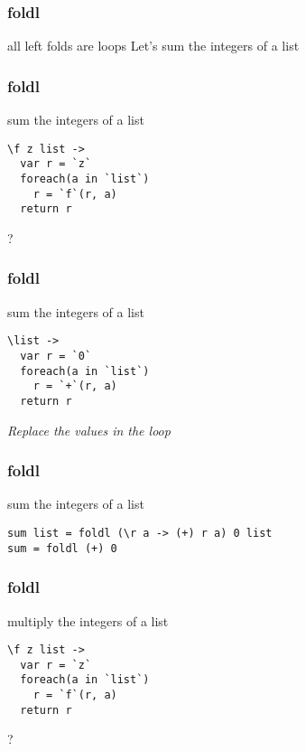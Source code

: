 \begin{frame}[fragile]
\frametitle{foldl}
\begin{block}{all left folds are loops}
Let's sum the integers of a list
\end{block}
\end{frame}

\begin{frame}[fragile]
\frametitle{foldl}
\begin{block}{sum the integers of a list}
\begin{lstlisting}[style=haskell,basicstyle=\scriptsize\ttfamily,mathescape]
\f z list ->
  var r = `z`
  foreach(a in `list`)
    r = `f`(r, a)
  return r
\end{lstlisting}
\end{block}
\begin{center}
\LARGE
?
\end{center}
\end{frame}

\begin{frame}[fragile]
\frametitle{foldl}
\begin{block}{sum the integers of a list}
\begin{lstlisting}[style=haskell,basicstyle=\scriptsize\ttfamily,mathescape]
\list ->
  var r = `0`
  foreach(a in `list`)
    r = `+`(r, a)
  return r
\end{lstlisting}
\end{block}
\begin{center}
\LARGE
\emph{Replace the values in the loop}
\end{center}
\end{frame}

\begin{frame}[fragile]
\frametitle{foldl}
\begin{block}{sum the integers of a list}
\begin{lstlisting}[style=haskell,basicstyle=\scriptsize\ttfamily,mathescape]
sum list = foldl (\r a -> (+) r a) 0 list
sum = foldl (+) 0
\end{lstlisting}
\end{block}
\end{frame}

\begin{frame}[fragile]
\frametitle{foldl}
\begin{block}{multiply the integers of a list}
\begin{lstlisting}[style=haskell,basicstyle=\scriptsize\ttfamily,mathescape]
\f z list ->
  var r = `z`
  foreach(a in `list`)
    r = `f`(r, a)
  return r
\end{lstlisting}
\end{block}
\begin{center}
\LARGE
?
\end{center}
\end{frame}

